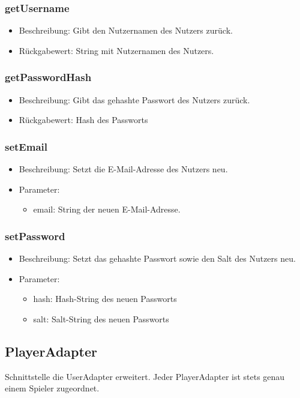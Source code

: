 \documentclass[a4paper]{scrreprt}
\begin{document}
	\subsubsection{getUsername}
	\begin{itemize}
		\item Beschreibung: Gibt den Nutzernamen des Nutzers zurück.
		\item Rückgabewert: String mit Nutzernamen des Nutzers.
	\end{itemize}
	
	\subsubsection{getPasswordHash}
	\begin{itemize}
		\item Beschreibung: Gibt das gehashte Passwort des Nutzers zurück.
		\item Rückgabewert: Hash des Passworts
	\end{itemize}
	
	\subsubsection{setEmail}
	\begin{itemize}
		\item Beschreibung: Setzt die E-Mail-Adresse des Nutzers neu.
		\item Parameter:
		\begin{itemize}
			\item email: String der neuen E-Mail-Adresse.
		\end{itemize}
	\end{itemize}
	
	\subsubsection{setPassword}
	\begin{itemize}
		\item Beschreibung: Setzt das gehashte Passwort sowie den Salt des Nutzers neu.
		\item Parameter:
		\begin{itemize}
			\item hash: Hash-String des neuen Passworts
			\item salt: Salt-String des neuen Passworts
		\end{itemize}
	\end{itemize}
	
	\subsection{PlayerAdapter}
	Schnittstelle die UserAdapter erweitert.
	Jeder PlayerAdapter ist stets genau einem Spieler zugeordnet.
	
\end{document}
